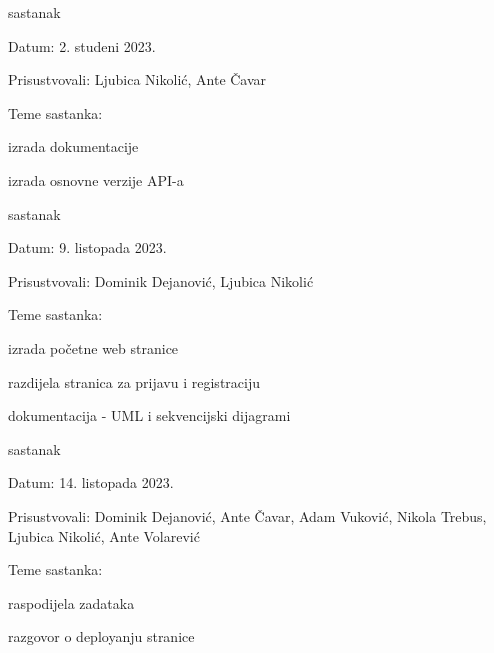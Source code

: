 \begin{packed_enum}
			
			\item  sastanak
			\item[] \begin{packed_item}
				\item Datum: 2. studeni 2023.
				\item Prisustvovali: Ljubica Nikolić, Ante Čavar
				\item Teme sastanka: 
				\begin{packed_item}
					\item izrada dokumentacije
					\item izrada osnovne verzije API-a
				\end{packed_item}
			\end{packed_item}
			
			\item  sastanak
			\item[] \begin{packed_item}
				\item Datum: 9. listopada 2023.
				\item Prisustvovali: Dominik Dejanović, Ljubica Nikolić
				\item Teme sastanka:
				\begin{packed_item}
					\item izrada početne web stranice
					\item razdijela stranica za prijavu i registraciju
					\item dokumentacija - UML i sekvencijski dijagrami
				\end{packed_item}
			\end{packed_item}
			
			\item  sastanak
			\item[] \begin{packed_item}
				\item Datum: 14. listopada 2023.
				\item Prisustvovali: Dominik Dejanović, Ante Čavar, Adam Vuković, Nikola Trebus, Ljubica Nikolić, Ante Volarević
				\item Teme sastanka:
				\begin{packed_item}
					\item raspodijela zadataka
					\item razgovor o deployanju stranice
				\end{packed_item}
			\end{packed_item}
			

\end{packed_enum}
